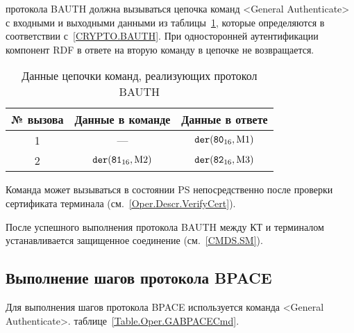  протокола BAUTH
должна вызываться цепочка команд <General Authenticate> 
с входными и выходными данными из таблицы~\ref{Table.Oper.BAUTH}, 
которые определяются в соответствии с~\ref{CRYPTO.BAUTH}. 
При односторонней аутентификации компонент RDF в ответе на вторую команду
в цепочке не возвращается.

\begin{table}[hbt]
\caption{Данные цепочки команд, реализующих протокол BAUTH}
\label{Table.Oper.BAUTH}
\begin{tabular}{|c|c|c|}
\hline
№ вызова & Данные в команде & Данные в ответе\\
\hline
\hline
1 & --- & $\texttt{der}(\texttt{80}_{16}, \text{M1})$\\
\hline
2 & $\texttt{der}(\texttt{81}_{16}, \text{M2})$ & 
$\texttt{der}(\texttt{82}_{16}, \text{M3})$  \\
\hline
\end{tabular}
\end{table}

Команда может вызываться  в состоянии PS  
непосредственно после проверки сертификата терминала
(см.~\ref{Oper.Descr.VerifyCert}).

После успешного выполнения протокола BAUTH между КТ и терминалом 
устанавливается защищенное соединение (см.~\ref{CMDS.SM}).

\subsection{Выполнение шагов протокола BPACE}
\label{Oper.Descr.GABPACE} 

Для выполнения шагов протокола BPACE используется команда <General 
Authenticate>. 
 таблице~\ref{Table.Oper.GABPACECmd}.

